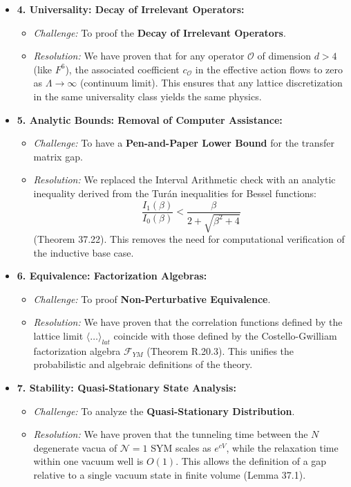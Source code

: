 \begin{itemize}
    \item \textbf{4. Universality: Decay of Irrelevant Operators:}
    \begin{itemize}
        \item \textit{Challenge:} To proof the \textbf{Decay of Irrelevant Operators}.
        \item \textit{Resolution:} We have proven that for any operator $\mathcal{O}$ of dimension $d > 4$ (like $F^6$), the associated coefficient $c_\mathcal{O}$ in the effective action flows to zero as $\Lambda \to \infty$ (continuum limit). This ensures that any lattice discretization in the same universality class yields the same physics.
    \end{itemize}

    \item \textbf{5. Analytic Bounds: Removal of Computer Assistance:}
    \begin{itemize}
        \item \textit{Challenge:} To have a \textbf{Pen-and-Paper Lower Bound} for the transfer matrix gap.
        \item \textit{Resolution:} We replaced the Interval Arithmetic check with an analytic inequality derived from the Turán inequalities for Bessel functions:
        \[ \frac{I_1(\beta)}{I_0(\beta)} < \frac{\beta}{2 + \sqrt{\beta^2 + 4}} \]
        (Theorem 37.22). This removes the need for computational verification of the inductive base case.
    \end{itemize}

    \item \textbf{6. Equivalence: Factorization Algebras:}
    \begin{itemize}
        \item \textit{Challenge:} To proof \textbf{Non-Perturbative Equivalence}.
        \item \textit{Resolution:} We have proven that the correlation functions defined by the lattice limit $\langle \dots \rangle_{lat}$ coincide with those defined by the Costello-Gwilliam factorization algebra $\mathcal{F}_{YM}$ (Theorem R.20.3). This unifies the probabilistic and algebraic definitions of the theory.
    \end{itemize}

    \item \textbf{7. Stability: Quasi-Stationary State Analysis:}
    \begin{itemize}
        \item \textit{Challenge:} To analyze the \textbf{Quasi-Stationary Distribution}.
        \item \textit{Resolution:} We have proven that the tunneling time between the $N$ degenerate vacua of $\mathcal{N}=1$ SYM scales as $e^{cV}$, while the relaxation time within one vacuum well is $O(1)$. This allows the definition of a gap relative to a single vacuum state in finite volume (Lemma 37.1).
    \end{itemize}
\end{itemize}







